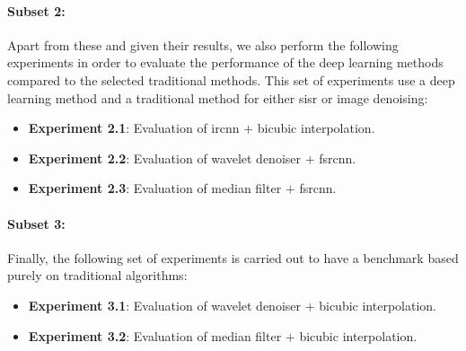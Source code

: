 \paragraph{Subset 2:}
Apart from these and given their results, we also perform the following experiments in order to evaluate the performance of the deep learning methods compared to the selected traditional methods. This set of experiments use a deep learning method and a traditional method for either \gls{sisr} or image denoising:
\begin{itemize}
	\item \textbf{Experiment 2.1}: Evaluation of \gls{ircnn} $+$ bicubic interpolation.
	\item \textbf{Experiment 2.2}: Evaluation of wavelet denoiser $+$ \gls{fsrcnn}.
	\item \textbf{Experiment 2.3}: Evaluation of median filter $+$ \gls{fsrcnn}.
\end{itemize}

\paragraph{Subset 3:}
Finally, the following set of experiments is carried out to have a benchmark based purely on traditional algorithms:
\begin{itemize}
\item \textbf{Experiment 3.1}:  Evaluation of wavelet denoiser $+$ bicubic interpolation.
\item \textbf{Experiment 3.2}:  Evaluation of median filter $+$ bicubic interpolation.
\end{itemize}
